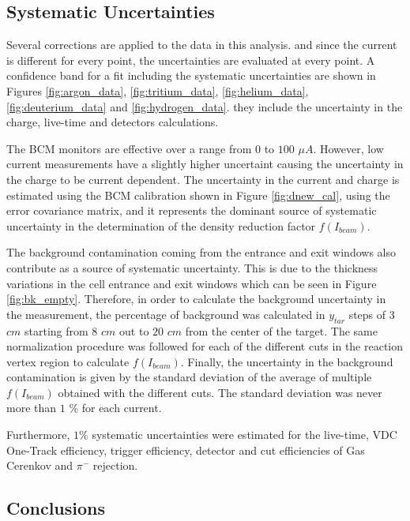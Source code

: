 \documentclass[final,5p,times,twocolumn]{elsarticle}
\begin{document}
\subsection{Systematic Uncertainties}

Several corrections are applied to the data in this analysis. and since the current is different for every point, the uncertainties are evaluated at every point.  A confidence band for a fit including the systematic uncertainties are shown in Figures  \ref{fig:argon_data}, \ref{fig:tritium_data}, \ref{fig:helium_data}, \ref{fig:deuterium_data} and \ref{fig:hydrogen_data}. they include the uncertainty in the charge, live-time and detectors calculations.

The BCM monitors are effective over a range from $0$ to $100$ $\mu A$. However, low current measurements have a slightly higher uncertaint causing the uncertainty in the charge to be current dependent. The uncertainty in the current and charge is estimated using the BCM calibration shown in Figure \ref{fig:dnew_cal}, using the error covariance matrix, and it represents the dominant source of systematic uncertainty in the determination of the density reduction factor $f(I_{beam})$.

The background contamination coming from the entrance and exit windows also contribute as a source of systematic uncertainty. This is due to the thickness variations in the cell entrance and exit windows which can be seen in Figure \ref{fig:bk_empty}. Therefore, in order to calculate the background uncertainty in the measurement, the percentage of background was calculated in $y_{tar}$ steps of $3$ $cm$ starting from $8$ $cm$ out to $20$ $cm$ from the center of the target.  The same normalization procedure was followed for each of the different cuts in the reaction vertex region to calculate $f(I_{beam})$. Finally, the uncertainty in the background contamination is given by the standard deviation of the average of multiple $f(I_{beam})$ obtained with the different cuts. The standard deviation was never more than $1$ $\% $ for each current.

Furthermore, $1\% $ systematic uncertainties were estimated for the live-time, VDC One-Track efficiency, trigger efficiency, detector and cut efficiencies of Gas Cerenkov and $\pi^{-}$ rejection.

\subsection {Conclusions }
\end{document}
